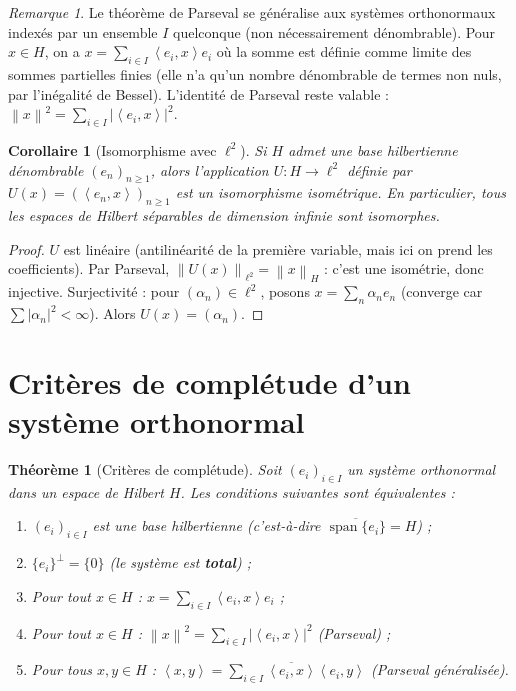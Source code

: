 \documentclass[a4paper,12pt]{book}
\DeclareMathOperator{\spn}{span}
\newcommand{\norm}[1]{\left\| #1 \right\|}
\newcommand{\abs}[1]{\left| #1 \right|}
\newcommand{\inner}[2]{\left\langle #1, #2 \right\rangle}
\theoremstyle{definition}
\theoremstyle{plain}
\newtheorem{theoreme}[definition]{Théorème}
\newtheorem{corollaire}[definition]{Corollaire}
\theoremstyle{remark}
\newtheorem{remarque}[definition]{Remarque}
\begin{document}
\begin{remarque}\label{rem:parseval-espace-non-separable}
Le théorème de Parseval se généralise aux systèmes orthonormaux indexés par un ensemble $I$ quelconque (non nécessairement dénombrable). Pour $x \in H$, on a $x = \sum_{i \in I}\inner{e_i}{x}e_i$ où la somme est définie comme limite des sommes partielles finies (elle n'a qu'un nombre dénombrable de termes non nuls, par l'inégalité de Bessel). L'identité de Parseval reste valable : $\norm{x}^2 = \sum_{i \in I}\abs{\inner{e_i}{x}}^2$.
\end{remarque}

\begin{corollaire}[Isomorphisme avec $\ell^2$]\label{cor:iso-ell2}
Si $H$ admet une base hilbertienne dénombrable $(e_n)_{n\geq 1}$, alors l'application $U : H \to \ell^2$ définie par $U(x) = (\inner{e_n}{x})_{n\geq 1}$ est un isomorphisme isométrique. En particulier, tous les espaces de Hilbert séparables de dimension infinie sont isomorphes.
\end{corollaire}

\begin{proof}
$U$ est linéaire (antilinéarité de la première variable, mais ici on prend les coefficients). Par Parseval, $\norm{U(x)}_{\ell^2} = \norm{x}_H$ : c'est une isométrie, donc injective. Surjectivité : pour $(\alpha_n) \in \ell^2$, posons $x = \sum_n \alpha_n e_n$ (converge car $\sum \abs{\alpha_n}^2 < \infty$). Alors $U(x) = (\alpha_n)$.
\end{proof}

\section{Critères de complétude d'un système orthonormal}

\begin{theoreme}[Critères de complétude]\label{thm:criteres-completude-son}
Soit $(e_i)_{i \in I}$ un système orthonormal dans un espace de Hilbert $H$. Les conditions suivantes sont équivalentes :
\begin{enumerate}[label=(\roman*)]
    \item $(e_i)_{i \in I}$ est une base hilbertienne (c'est-à-dire $\overline{\spn\{e_i\}} = H$) ;
    \item $\{e_i\}^\perp = \{0\}$ (le système est \textbf{total}) ;
    \item Pour tout $x \in H$ : $x = \sum_{i \in I} \inner{e_i}{x} e_i$ ;
    \item Pour tout $x \in H$ : $\norm{x}^2 = \sum_{i \in I}\abs{\inner{e_i}{x}}^2$ (Parseval) ;
    \item Pour tous $x, y \in H$ : $\inner{x}{y} = \sum_{i \in I}\overline{\inner{e_i}{x}}\inner{e_i}{y}$ (Parseval généralisée).
\end{enumerate}
\end{theoreme}
\end{document}
